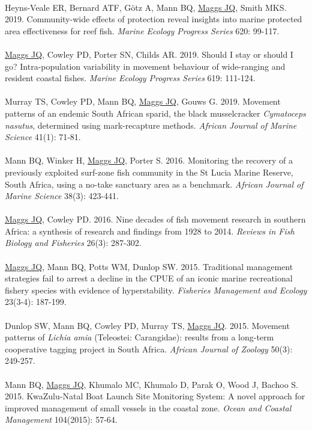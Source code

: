 \documentclass[10pt,a4paper]{article}
\begin{document}
\\
Heyns-Veale ER, Bernard ATF, G\"otz A, Mann BQ, \underline{Maggs JQ}, Smith MKS. 2019. Community-wide effects of protection reveal insights into marine protected area effectiveness for reef fish. \textit{Marine Ecology Progress Series} 620: 99-117.\\
\\
\underline{Maggs JQ}, Cowley PD, Porter SN, Childs AR. 2019. Should I stay or should I go? Intra-population variability in movement behaviour of wide-ranging and resident coastal fishes. \textit{Marine Ecology Progress Series} 619: 111-124.\\
\\ 
Murray TS, Cowley PD, Mann BQ, \underline{Maggs JQ}, Gouws G. 2019. Movement patterns of an endemic South African sparid, the black musselcracker \textit{Cymatoceps nasutus}, determined using mark-recapture methods. \textit{African Journal of Marine Science} 41(1): 71-81.\\
\\  
Mann BQ, Winker H, \underline{Maggs JQ}, Porter S. 2016. Monitoring the recovery of a previously exploited surf-zone fish community in the St Lucia Marine Reserve, South Africa, using a no-take sanctuary area as a benchmark. \textit{African Journal of Marine Science} 38(3): 423-441.\\
\\
\underline{Maggs JQ}, Cowley PD. 2016. Nine decades of fish movement research in southern Africa: a synthesis of research and findings from 1928 to 2014. \textit{Reviews in Fish Biology and Fisheries} 26(3): 287-302.\\
\\
\underline{Maggs JQ}, Mann BQ, Potts WM, Dunlop SW. 2015. Traditional management strategies fail to arrest a decline in the CPUE of an iconic marine recreational fishery species with evidence of hyperstability. \textit{Fisheries Management and Ecology} 23(3-4): 187-199.\\
\\
Dunlop SW, Mann BQ, Cowley PD, Murray TS, \underline{Maggs JQ}. 2015. Movement patterns of \textit{Lichia amia} (Teleostei: Carangidae): results from a long-term cooperative tagging project in South Africa. \textit{African Journal of Zoology} 50(3): 249-257.\\
\\
Mann BQ, \underline{Maggs JQ}, Khumalo MC, Khumalo D, Parak O, Wood J, Bachoo S. 2015. KwaZulu-Natal Boat Launch Site Monitoring System: A novel approach for improved management of small vessels in the coastal zone. \textit{Ocean and Coastal Management} 104(2015): 57-64.\\
\end{document}
